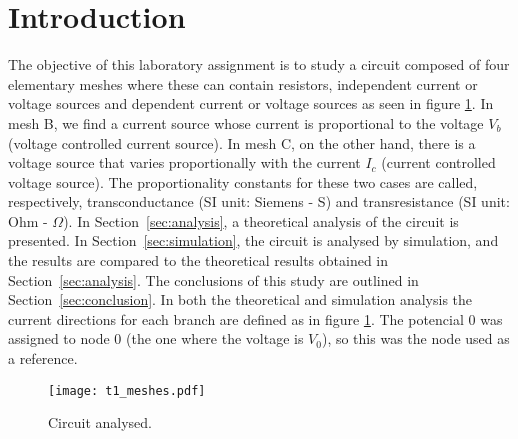 \newpage
\section{Introduction}
\label{sec:introduction}

The objective of this laboratory assignment is to study a circuit composed of
four elementary meshes where these can contain resistors, independent current or voltage sources
and dependent current or voltage sources as seen in figure
\ref{fig:rc}.
In mesh B, we find a current source whose current is proportional to the voltage $V_{b}$
(voltage controlled current source).
In mesh C, on the other hand, there is a voltage source that varies proportionally
with the current $I_c$ (current controlled voltage source).
The proportionality constants for these two cases are called, respectively,
transconductance (SI unit: Siemens - S) and transresistance (SI unit: Ohm - $\Omega$).
In Section~\ref{sec:analysis}, a theoretical analysis of the circuit is
presented. In Section~\ref{sec:simulation}, the circuit is analysed by
simulation, and the results are compared to the theoretical results obtained in
Section~\ref{sec:analysis}. The conclusions of this study are outlined in
Section~\ref{sec:conclusion}. In both the theoretical and simulation analysis the current directions for each branch are defined as in figure \ref{fig:rc}. The potencial $0$ was assigned to node $0$ (the one where the voltage is $V_{0}$), so this was the node used as a reference.

\begin{figure}[h] \centering
    \texttt{[image: t1\_meshes.pdf]}
    \caption{Circuit analysed.}
    \label{fig:rc}
\end{figure}

